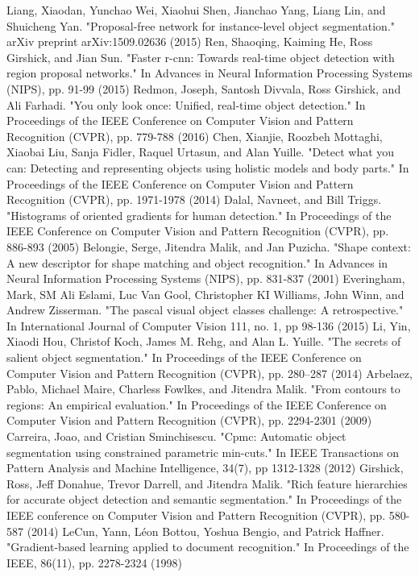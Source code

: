 \begin{thebibliography}{}
Liang, Xiaodan, Yunchao Wei, Xiaohui Shen, Jianchao Yang, Liang Lin, and Shuicheng Yan. "Proposal-free network for instance-level object segmentation." arXiv preprint arXiv:1509.02636 (2015)
Ren, Shaoqing, Kaiming He, Ross Girshick, and Jian Sun. "Faster r-cnn: Towards real-time object detection with region proposal networks." In Advances in Neural Information Processing Systems (NIPS), pp. 91-99 (2015)
Redmon, Joseph, Santosh Divvala, Ross Girshick, and Ali Farhadi. "You only look once: Unified, real-time object detection." In Proceedings of the IEEE Conference on Computer Vision and Pattern Recognition (CVPR), pp. 779-788 (2016)
%
Chen, Xianjie, Roozbeh Mottaghi, Xiaobai Liu, Sanja Fidler, Raquel Urtasun, and Alan Yuille. "Detect what you can: Detecting and representing objects using holistic models and body parts." In Proceedings of the IEEE Conference on Computer Vision and Pattern Recognition (CVPR), pp. 1971-1978 (2014)
%
Dalal, Navneet, and Bill Triggs. "Histograms of oriented gradients for human detection." In Proceedings of the IEEE Conference on Computer Vision and Pattern Recognition (CVPR), pp. 886-893 (2005)
Belongie, Serge, Jitendra Malik, and Jan Puzicha. "Shape context: A new descriptor for shape matching and object recognition." In Advances in Neural Information Processing Systems (NIPS), pp. 831-837 (2001)
Everingham, Mark, SM Ali Eslami, Luc Van Gool, Christopher KI Williams, John Winn, and Andrew Zisserman. "The pascal visual object classes challenge: A retrospective." In International Journal of Computer Vision 111, no. 1, pp 98-136 (2015)
Li, Yin, Xiaodi Hou, Christof Koch, James M. Rehg, and Alan L. Yuille. "The secrets of salient object segmentation." In Proceedings of the IEEE Conference on Computer Vision and Pattern Recognition (CVPR), pp. 280–287 (2014)
%
Arbelaez, Pablo, Michael Maire, Charless Fowlkes, and Jitendra Malik. "From contours to regions: An empirical evaluation." In Proceedings of the IEEE Conference on Computer Vision and Pattern Recognition (CVPR), pp. 2294-2301 (2009)
Carreira, Joao, and Cristian Sminchisescu. "Cpmc: Automatic object segmentation using constrained parametric min-cuts." In IEEE Transactions on Pattern Analysis and Machine Intelligence, 34(7), pp 1312-1328 (2012)
Girshick, Ross, Jeff Donahue, Trevor Darrell, and Jitendra Malik. "Rich feature hierarchies for accurate object detection and semantic segmentation." In Proceedings of the IEEE conference on Computer Vision and Pattern Recognition (CVPR), pp. 580-587 (2014)
LeCun, Yann, Léon Bottou, Yoshua Bengio, and Patrick Haffner. "Gradient-based learning applied to document recognition." In Proceedings of the IEEE, 86(11), pp. 2278-2324 (1998)

\end{thebibliography}



